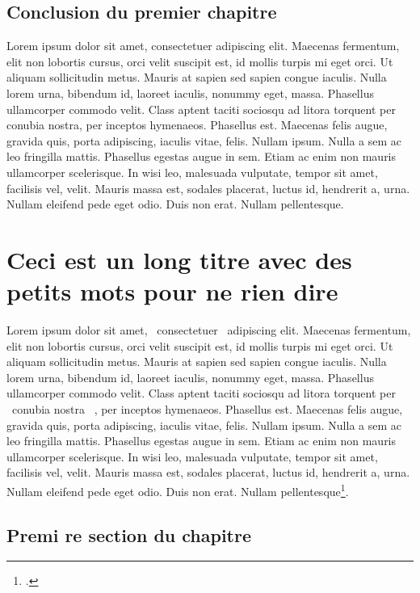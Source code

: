 \documentclass{article}
\begin{document}
\section{Conclusion du premier chapitre}


Lorem ipsum dolor sit amet, consectetuer adipiscing elit. Maecenas fermentum, elit non lobortis cursus, orci velit suscipit est, id mollis turpis mi eget orci. Ut aliquam sollicitudin metus. Mauris at sapien sed sapien congue iaculis. Nulla lorem urna, bibendum id, laoreet iaculis, nonummy eget, massa. Phasellus ullamcorper commodo velit. Class aptent taciti sociosqu ad litora torquent per conubia nostra, per inceptos hymenaeos. Phasellus est. Maecenas felis augue, gravida quis, porta adipiscing, iaculis vitae, felis. Nullam ipsum. Nulla a sem ac leo fringilla mattis. Phasellus egestas augue in sem. Etiam ac enim non mauris ullamcorper scelerisque. In wisi leo, malesuada vulputate, tempor sit amet, facilisis vel, velit. Mauris massa est, sodales placerat, luctus id, hendrerit a, urna. Nullam eleifend pede eget odio. Duis non erat. Nullam pellentesque.

\clearemptydoublepage

\chapter[Ceci est un long titre]{Ceci est un long titre avec des petits mots pour ne rien dire}

Lorem ipsum dolor sit amet,  ~consectetuer~  adipiscing elit. Maecenas fermentum, elit non lobortis cursus, orci velit suscipit est, id mollis turpis mi eget orci. Ut aliquam sollicitudin metus. Mauris at sapien sed sapien congue iaculis. Nulla lorem urna, bibendum id, laoreet iaculis, nonummy eget, massa. Phasellus ullamcorper commodo velit. Class aptent taciti sociosqu ad litora torquent per  ~conubia nostra~ , per inceptos hymenaeos. Phasellus est. Maecenas felis augue, gravida quis, porta adipiscing, iaculis vitae, felis. Nullam ipsum. Nulla a sem ac leo fringilla mattis. Phasellus egestas augue in sem. Etiam ac enim non mauris ullamcorper scelerisque. In wisi leo, malesuada vulputate, tempor sit amet, facilisis vel, velit. Mauris massa est, sodales placerat, luctus id, hendrerit a, urna. Nullam eleifend pede eget odio. Duis non erat. Nullam pellentesque\footcite[225]{Doule1887}.

\section{Premi re section du chapitre}
\end{document}
